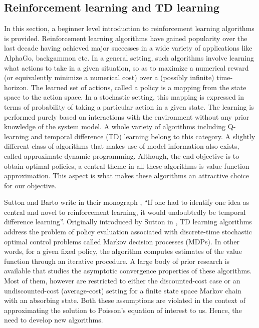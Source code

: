 

\subsection{Reinforcement learning and TD learning}
\label{s:rl_td}
In this section, a beginner level introduction to reinforcement learning algorithms is provided. Reinforcement learning algorithms have gained popularity over the last decade having achieved major successes in a wide variety of applications like AlphaGo, backgammon etc.  In a general setting, such algorithms involve learning what actions to take in a given situation, so as to maximize a numerical reward (or equivalently minimize a numerical cost) over a (possibly infinite) time-horizon. The learned set of actions, called a policy is a mapping from the state space to the action space. In a stochastic setting, this mapping is expressed in terms of probability of taking a particular action in a given state. The learning is performed purely based on interactions with the environment without any prior knowledge of the system model. A whole variety of algorithms including Q-learning \cite{watday92a} and temporal difference (TD) learning \cite{sut88} belong to this category. A slightly different class of algorithms that makes use of model information also exists, called approximate dynamic programming. 
Although, the end objective is to obtain optimal policies, a central theme in all these algorithms is value function approximation. This aspect is what makes these algorithms an attractive choice for our objective. 

Sutton and Barto write in their monograph \cite{sutbar98}, ``If one had to identify one idea as central and novel to reinforcement learning, it would undoubtedly be temporal difference learning''. Originally introduced by Sutton in \cite{sut88}, TD learning algorithms address the problem of policy evaluation associated with discrete-time stochastic optimal control problems called Markov decision processes (MDPs). In other words, for a given fixed policy, the algorithm computes estimates of the value function through an iterative procedure. A large body of prior research is available that studies the asymptotic convergence properties of these algorithms. Most of them, however are restricted to either the discounted-cost case or an undiscounted-cost (average-cost) setting for a finite state space Markov chain with an absorbing state. Both these assumptions are violated in the context of approximating the solution to Poisson's equation of interest to us. Hence, the need to develop new algorithms. 


